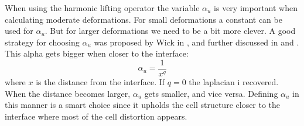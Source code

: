 When using the harmonic lifting operator the variable $\alpha_u$ is very important when calculating moderate deformations. For small deformations a constant can be used for $\alpha_u$. But for larger deformations we need to be a bit more clever. A good strategy for choosing $\alpha_u$ was proposed by Wick in \cite{Wick2011a}, and further discussed in \cite{Stein2003} and \cite{MM2016}. This alpha gets bigger when closer to the interface: 
\begin{equation}
\alpha_u = \frac{1}{x^q}
\end{equation}
where $x$ is the distance from the interface. If $q=0$ the laplacian i recovered. When the distance becomes larger, $\alpha_u$ gets smaller, and vice versa. 
Defining $\alpha_u$ in this manner is a smart choice since it upholds the cell structure closer to the interface where most of the cell distortion appears. 

